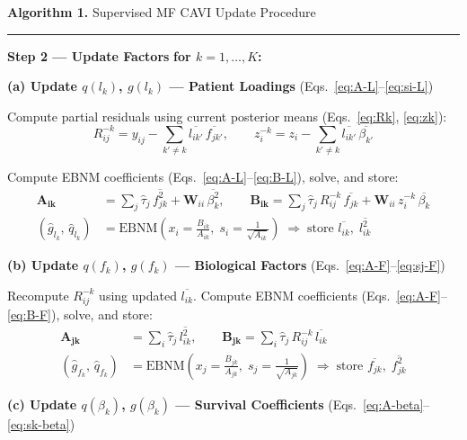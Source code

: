 \documentclass{article}[12pt]
\begin{document}
\begin{algobox}{\textbf{Algorithm 1.} Supervised MF CAVI Update Procedure}
\medskip
\hrule
\medskip

\hspace{1em}\textbf{Step 2 --- Update Factors} \quad\textbf{for $k = 1,\ldots,K$:}

\medskip
\hspace{2em}\textbf{(a) Update $q(l_k)$, $g(l_k)$ --- Patient Loadings}
\quad(Eqs.~\ref{eq:A-L}--\ref{eq:si-L})

\medskip
\hspace{3em}Compute partial residuals using current posterior means (Eqs.~\ref{eq:Rk}, \ref{eq:zk}):
\[
    R^{-k}_{ij} = y_{ij} - \sum_{k'\neq k}\overline{l_{ik'}}\,\overline{f_{jk'}},
    \qquad
    z_i^{-k} = z_i - \sum_{k'\neq k}\overline{l_{ik'}}\,\overline{\beta_{k'}}
\]

\hspace{3em}Compute EBNM coefficients (Eqs.~\ref{eq:A-L}--\ref{eq:B-L}), solve, and store:
\begin{align*}
    \mathbf{A_{ik}} &= \sum_j \hat{\tau}_j\,\overline{f^2_{jk}} + \mathbf{W}_{ii}\,\overline{\beta^2_k},
    \qquad
    \mathbf{B_{ik}} = \sum_j \hat{\tau}_j\,R^{-k}_{ij}\,\overline{f_{jk}}
                    + \mathbf{W}_{ii}\,z_i^{-k}\,\overline{\beta_k}\\
    \left(\hat{g}_{l_k},\,\hat{q}_{l_k}\right)
    &= \mathrm{EBNM}\!\left(x_i = \tfrac{B_{ik}}{A_{ik}},\; s_i = \tfrac{1}{\sqrt{A_{ik}}}\right)
    \;\Rightarrow\;\text{store } \overline{l_{ik}},\; \overline{l_{ik}^2}
\end{align*}

\medskip
\hspace{2em}\textbf{(b) Update $q(f_k)$, $g(f_k)$ --- Biological Factors}
\quad(Eqs.~\ref{eq:A-F}--\ref{eq:sj-F})

\medskip
\hspace{3em}Recompute $R^{-k}_{ij}$ using updated $\overline{l_{ik}}$.
Compute EBNM coefficients (Eqs.~\ref{eq:A-F}--\ref{eq:B-F}), solve, and store:
\begin{align*}
    \mathbf{A_{jk}} &= \sum_i \hat{\tau}_j\,\overline{l^2_{ik}},
    \qquad
    \mathbf{B_{jk}} = \sum_i \hat{\tau}_j\,R^{-k}_{ij}\,\overline{l_{ik}}\\
    \left(\hat{g}_{f_k},\,\hat{q}_{f_k}\right)
    &= \mathrm{EBNM}\!\left(x_j = \tfrac{B_{jk}}{A_{jk}},\; s_j = \tfrac{1}{\sqrt{A_{jk}}}\right)
    \;\Rightarrow\;\text{store } \overline{f_{jk}},\; \overline{f_{jk}^2}
\end{align*}

\medskip
\hspace{2em}\textbf{(c) Update $q(\beta_k)$, $g(\beta_k)$ --- Survival Coefficients}
\quad(Eqs.~\ref{eq:A-beta}--\ref{eq:sk-beta})


\end{algobox}
\end{document}
